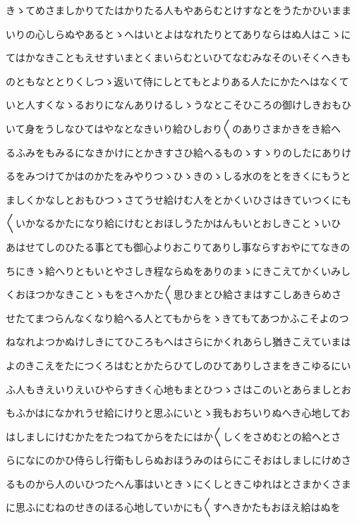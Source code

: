 \documentclass[a4paper,11pt,landscape]{ltjtarticle}
\begin{document}
きゝてめさましかりてたはかりたる人もやあらむとけすなとをうたかひいまま
\par\medskip
いりの心しらぬやあるとゝへはいとよはなれたりとてありならはぬ人はこゝに
\par\medskip
てはかなきこともえせすいまとくまいらむといひてなむみなそのいそくへきも
\par\medskip
のともなととりくしつゝ返いて侍にしとてもとよりある人たにかたへはなくて
\par\medskip
いと人すくなゝるおりになんありけるしゝうなとこそひころの御けしきおもひ
\par\medskip
いて身をうしなひてはやなとなきいり給ひしおり〱のありさまかきをき給へ
\par\medskip
るふみをもみるになきかけにとかきすさひ給へるものゝすゝりのしたにありけ
\par\medskip
るをみつけてかはのかたをみやりつゝひゝきのゝしる水のをとをきくにもうと
\par\medskip
ましくかなしとおもひつゝさてうせ給けむ人をとかくいひさはきていつくにも
\par\medskip
〱いかなるかたになり給にけむとおほしうたかはんもいとおしきことゝいひ
\par\medskip
あはせてしのひたる事とても御心よりおこりてありし事ならすおやにてなきの
\par\medskip
ちにきゝ給へりともいとやさしき程ならぬをありのまゝにきこえてかくいみし
\par\medskip
くおほつかなきことゝもをさへかた〱思ひまとひ給さまはすこしあきらめさ
\par\medskip
せたてまつらんなくなり給へる人とてもからをゝきてもてあつかふこそよのつ
\par\medskip
ねなれよつかぬけしきにてひころもへはさらにかくれあらし猶きこえていまは
\par\medskip
よのきこえをたにつくろはむとかたらひてしのひてありしさまをきこゆるにい
\par\medskip
ふ人もきえいりえいひやらすきく心地もまとひつゝさはこのいとあらましとお
\par\medskip
もふかはになかれうせ給にけりと思ふにいとゝ我もおちいりぬへき心地してお
\par\medskip
はしましにけむかたをたつねてからをたにはか〱しくをさめむとの給へとさ
\par\medskip
らになにのかひ侍らし行衛もしらぬおほうみのはらにこそおはしましにけめさ
\par\medskip
るものから人のいひつたへん事はいときゝにくしときこゆれはとさまかくさま
\par\medskip
に思ふにむねのせきのほる心地していかにも〱すへきかたもおほえ給はぬを
\end{document}
